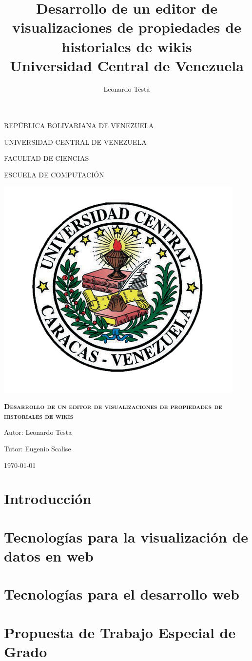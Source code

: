 \documentclass[a4paper]{report}
\title{
	{Desarrollo de un editor de visualizaciones de propiedades de historiales de wikis}\\
	{\large Universidad Central de Venezuela}\\
}
\author{Leonardo Testa}
\begin{document}
\begin{titlepage}
	\centering
  REPÚBLICA BOLIVARIANA DE VENEZUELA\par
  UNIVERSIDAD CENTRAL DE VENEZUELA\par
  FACULTAD DE CIENCIAS\par
  ESCUELA DE COMPUTACIÓN\par\vspace{3cm}

	\includegraphics[scale=0.60]{ucv_logo.png}\par\vspace{1cm}
	{\scshape\Large\textbf{Desarrollo de un editor de visualizaciones de propiedades de historiales de wikis}\par}
	\vspace{1cm}
	{\Large Autor: Leonardo Testa\par}
	\vfill

  {\large Tutor: Eugenio Scalise\par}
	{\large \mydate\today \par}
\end{titlepage}

\tableofcontents
\listoffigures
\chapter{Introducción}

\chapter{Tecnologías para la visualización de datos en web}

\chapter{Tecnologías para el desarrollo web}

\chapter{Propuesta de Trabajo Especial de Grado}


\clearpage

\printbibliography
\end{document}
